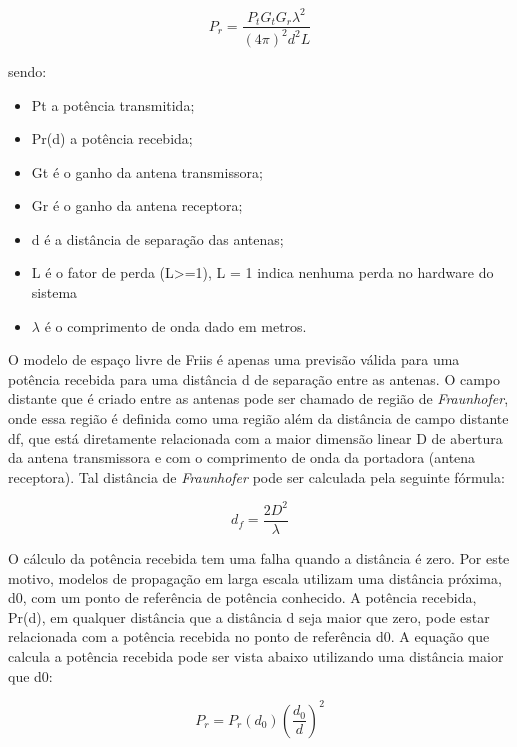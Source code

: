 \documentclass[
	12pt,				%
	openright,			%
	twoside,			%
	a4paper,			%
	english,			%
	french,				%
	spanish,			%
	brazil				%
	]{abntex2}
\begin{document}

\begin{equation}
P_{r}= \frac{P_{t}G_{t}G_{r}\lambda^{2}}{(4\pi)^{2}d^{2}L}
\end{equation}

sendo:

\begin{itemize}
	\item Pt a potência transmitida;
	\item Pr(d) a potência recebida;
	\item Gt é o ganho da antena transmissora;
	\item Gr é o ganho da antena receptora;
	\item d é a distância de separação das antenas;
	\item L é o fator de perda (L>=1), L = 1 indica nenhuma perda no hardware do sistema
	\item $ \lambda $ é o comprimento de onda dado em metros.
\end{itemize}

O modelo de espaço livre de Friis é apenas uma previsão válida para uma potência recebida para uma distância d de separação entre as antenas. O campo distante que é criado entre as antenas pode ser chamado de região de \textit{Fraunhofer}, onde essa região é definida como uma região além da distância de campo distante df, que está diretamente relacionada com a maior dimensão linear D de abertura da antena transmissora e com o comprimento de onda da portadora (antena receptora). Tal distância de \textit{Fraunhofer} pode ser calculada pela seguinte fórmula:


\begin{equation}
	d_{f} =  \frac{2D^{2}}{\lambda}
\end{equation}

O cálculo da potência recebida tem uma falha quando a distância é zero. Por este motivo, modelos de propagação em larga escala utilizam uma distância próxima, d0, com um ponto de referência de potência conhecido. A potência recebida, Pr(d), em qualquer distância que a distância d seja maior que zero, pode estar relacionada com a potência recebida no ponto de referência d0. A equação que calcula a potência recebida pode ser vista abaixo utilizando uma distância maior que d0:


\begin{equation}
P_{r} = P_{r}(d_{0})(\frac{d_{0}}{d})^{2}
\end{equation}
\end{document}
